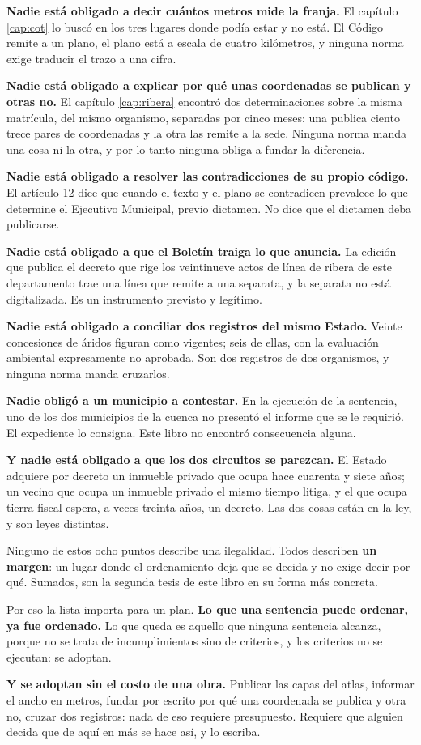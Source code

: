 \textbf{Nadie está obligado a decir cuántos metros mide la franja.} El capítulo
\ref{cap:cot} lo buscó en los tres lugares donde podía estar y no está. El Código remite a un
plano, el plano está a escala de cuatro kilómetros, y ninguna norma exige traducir el trazo a
una cifra.

\textbf{Nadie está obligado a explicar por qué unas coordenadas se publican y otras no.} El
capítulo \ref{cap:ribera} encontró dos determinaciones sobre la misma matrícula, del mismo
organismo, separadas por cinco meses: una publica ciento trece pares de coordenadas y la
otra las remite a la sede. Ninguna norma manda una cosa ni la otra, y por lo tanto ninguna
obliga a fundar la diferencia.

\textbf{Nadie está obligado a resolver las contradicciones de su propio código.} El artículo
12 dice que cuando el texto y el plano se contradicen prevalece lo que determine el Ejecutivo
Municipal, previo dictamen. No dice que el dictamen deba publicarse.

\textbf{Nadie está obligado a que el Boletín traiga lo que anuncia.} La edición que publica el
decreto que rige los veintinueve actos de línea de ribera de este departamento trae una línea que remite
a una separata, y la separata no está digitalizada. Es un instrumento previsto y legítimo.

\textbf{Nadie está obligado a conciliar dos registros del mismo Estado.} Veinte concesiones de
áridos figuran como vigentes; seis de ellas, con la evaluación ambiental expresamente no
aprobada. Son dos registros de dos organismos, y ninguna norma manda cruzarlos.

\textbf{Nadie obligó a un municipio a contestar.} En la ejecución de la sentencia, uno de los
dos municipios de la cuenca no presentó el informe que se le requirió. El expediente lo
consigna. Este libro no encontró consecuencia alguna.

\textbf{Y nadie está obligado a que los dos circuitos se parezcan.} El Estado adquiere por
decreto un inmueble privado que ocupa hace cuarenta y siete años; un vecino que ocupa un inmueble privado el mismo tiempo litiga, y el que ocupa tierra fiscal espera, a veces treinta años, un decreto. Las dos cosas están en la ley, y son leyes distintas.

\begin{cautela}
Ninguno de estos ocho puntos describe una ilegalidad. Todos describen \textbf{un margen}: un
lugar donde el ordenamiento deja que se decida y no exige decir por qué. Sumados, son la
segunda tesis de este libro en su forma más concreta.

Por eso la lista importa para un plan. \textbf{Lo que una sentencia puede ordenar, ya fue
ordenado.} Lo que queda es aquello que ninguna sentencia alcanza, porque no se trata de
incumplimientos sino de criterios, y los criterios no se ejecutan: se adoptan.

\textbf{Y se adoptan sin el costo de una obra.} Publicar las capas del atlas, informar el ancho
en metros, fundar por escrito por qué una coordenada se publica y otra no, cruzar dos
registros: nada de eso requiere presupuesto. Requiere que alguien decida que de aquí en más se
hace así, y lo escriba.
\end{cautela}

